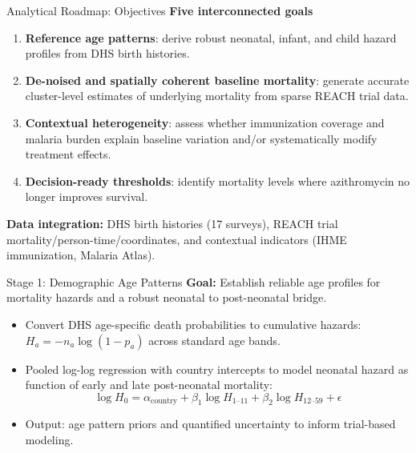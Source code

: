 \documentclass[aspectratio=169]{beamer}\usepackage[]{graphicx}\usepackage[dvipsnames]{xcolor}
\begin{document}
\begin{frame}{Analytical Roadmap: Objectives}
\textbf{Five interconnected goals}

\begin{enumerate}
  \item \textbf{Reference age patterns}: derive robust neonatal, infant, and child hazard profiles from DHS birth histories.
  \item \textbf{De-noised and spatially coherent baseline mortality}: generate accurate cluster-level estimates of underlying mortality from sparse REACH trial data.
  \item \textbf{Contextual heterogeneity}: assess whether immunization coverage and malaria burden explain baseline variation and/or systematically modify treatment effects.
  \item \textbf{Decision-ready thresholds}: identify mortality levels where azithromycin no longer improves survival.
\end{enumerate}

\vspace{0.4cm}
\textbf{Data integration:} DHS birth histories (17 surveys), REACH trial mortality/person-time/coordinates, and contextual indicators (IHME immunization, Malaria Atlas).
\end{frame}

\begin{frame}{Stage 1: Demographic Age Patterns}
\textbf{Goal:} Establish reliable age profiles for mortality hazards and a robust neonatal to post-neonatal bridge.

\begin{itemize}
  \item Convert DHS age-specific death probabilities to cumulative hazards:
        $H_a = -n_a \log(1 - p_a)$ across standard age bands.
  \item Pooled log-log regression with country intercepts to model neonatal hazard as function of early and late post-neonatal mortality:
        \[
          \log H_0 = \alpha_{\text{country}} + \beta_1 \log H_{1\text{--}11}
                     + \beta_2 \log H_{12\text{--}59} + \epsilon
        \]
  \item Output: age pattern priors and quantified uncertainty to inform trial-based modeling.
\end{itemize}
\end{frame}
\end{document}
